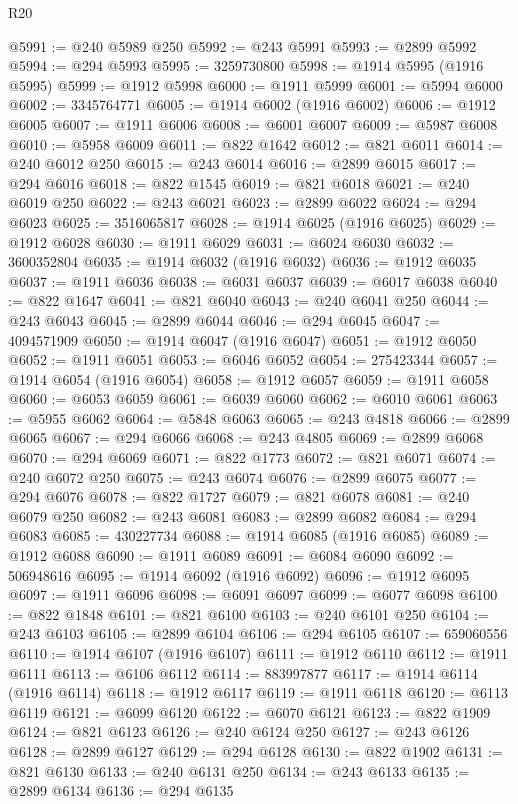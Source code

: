 \begin{lexlean}{R20}
\begin{coremodule}
{@5991 := @240 @5989 @250
@5992 := @243 @5991
@5993 := @2899 @5992
@5994 := @294 @5993
@5995 := 3259730800
@5998 := @1914 @5995 (@1916 @5995)
@5999 := @1912 @5998
@6000 := @1911 @5999
@6001 := @5994 @6000
@6002 := 3345764771
@6005 := @1914 @6002 (@1916 @6002)
@6006 := @1912 @6005
@6007 := @1911 @6006
@6008 := @6001 @6007
@6009 := @5987 @6008
@6010 := @5958 @6009
@6011 := @822 @1642
@6012 := @821 @6011
@6014 := @240 @6012 @250
@6015 := @243 @6014
@6016 := @2899 @6015
@6017 := @294 @6016
@6018 := @822 @1545
@6019 := @821 @6018
@6021 := @240 @6019 @250
@6022 := @243 @6021
@6023 := @2899 @6022
@6024 := @294 @6023
@6025 := 3516065817
@6028 := @1914 @6025 (@1916 @6025)
@6029 := @1912 @6028
@6030 := @1911 @6029
@6031 := @6024 @6030
@6032 := 3600352804
@6035 := @1914 @6032 (@1916 @6032)
@6036 := @1912 @6035
@6037 := @1911 @6036
@6038 := @6031 @6037
@6039 := @6017 @6038
@6040 := @822 @1647
@6041 := @821 @6040
@6043 := @240 @6041 @250
@6044 := @243 @6043
@6045 := @2899 @6044
@6046 := @294 @6045
@6047 := 4094571909
@6050 := @1914 @6047 (@1916 @6047)
@6051 := @1912 @6050
@6052 := @1911 @6051
@6053 := @6046 @6052
@6054 := 275423344
@6057 := @1914 @6054 (@1916 @6054)
@6058 := @1912 @6057
@6059 := @1911 @6058
@6060 := @6053 @6059
@6061 := @6039 @6060
@6062 := @6010 @6061
@6063 := @5955 @6062
@6064 := @5848 @6063
@6065 := @243 @4818
@6066 := @2899 @6065
@6067 := @294 @6066
@6068 := @243 @4805
@6069 := @2899 @6068
@6070 := @294 @6069
@6071 := @822 @1773
@6072 := @821 @6071
@6074 := @240 @6072 @250
@6075 := @243 @6074
@6076 := @2899 @6075
@6077 := @294 @6076
@6078 := @822 @1727
@6079 := @821 @6078
@6081 := @240 @6079 @250
@6082 := @243 @6081
@6083 := @2899 @6082
@6084 := @294 @6083
@6085 := 430227734
@6088 := @1914 @6085 (@1916 @6085)
@6089 := @1912 @6088
@6090 := @1911 @6089
@6091 := @6084 @6090
@6092 := 506948616
@6095 := @1914 @6092 (@1916 @6092)
@6096 := @1912 @6095
@6097 := @1911 @6096
@6098 := @6091 @6097
@6099 := @6077 @6098
@6100 := @822 @1848
@6101 := @821 @6100
@6103 := @240 @6101 @250
@6104 := @243 @6103
@6105 := @2899 @6104
@6106 := @294 @6105
@6107 := 659060556
@6110 := @1914 @6107 (@1916 @6107)
@6111 := @1912 @6110
@6112 := @1911 @6111
@6113 := @6106 @6112
@6114 := 883997877
@6117 := @1914 @6114 (@1916 @6114)
@6118 := @1912 @6117
@6119 := @1911 @6118
@6120 := @6113 @6119
@6121 := @6099 @6120
@6122 := @6070 @6121
@6123 := @822 @1909
@6124 := @821 @6123
@6126 := @240 @6124 @250
@6127 := @243 @6126
@6128 := @2899 @6127
@6129 := @294 @6128
@6130 := @822 @1902
@6131 := @821 @6130
@6133 := @240 @6131 @250
@6134 := @243 @6133
@6135 := @2899 @6134
@6136 := @294 @6135
}
\end{coremodule}
\end{lexlean}

